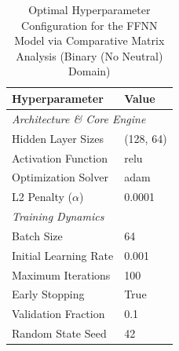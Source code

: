 \begin{table}[H]
    \centering
    \caption{Optimal Hyperparameter Configuration for the FFNN Model via Comparative Matrix Analysis (Binary (No Neutral) Domain)}
    \label{tab:comparator_ffnn_hyperparameters}
    \small
    \begin{tabular}{ll}
    \toprule
    \textbf{Hyperparameter} & \textbf{Value} \\
    \midrule
    \multicolumn{2}{l}{\textit{Architecture \& Core Engine}} \\
    Hidden Layer Sizes & (128, 64) \\
    Activation Function & relu \\
    Optimization Solver & adam \\
    L2 Penalty ($\alpha$) & 0.0001 \\
    \midrule
    \multicolumn{2}{l}{\textit{Training Dynamics}} \\
    Batch Size & 64 \\
    Initial Learning Rate & 0.001 \\
    Maximum Iterations & 100 \\
    Early Stopping & True \\
    Validation Fraction & 0.1 \\
    Random State Seed & 42 \\
    \bottomrule
    \end{tabular}
    \end{table}
